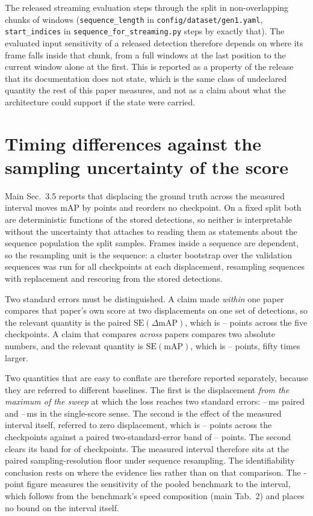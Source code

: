 \documentclass[10pt,twocolumn,letterpaper]{article}
\begin{document}
The released streaming evaluation steps through the split in non-overlapping chunks of
\ssmEvalChunk{} windows (\texttt{sequence\_length} in \texttt{config/dataset/gen1.yaml},
\texttt{start\_indices} in \texttt{sequence\_for\_streaming.py} steps by exactly that). The
evaluated input sensitivity of a released detection therefore depends on where its frame falls inside
that chunk, from a full \ssmEvalChunk{} windows at the last position to the current window
alone at the first. This is reported as a property of the release that its documentation does
not state, which is the same class of undeclared quantity the rest of this paper measures,
and not as a claim about what the architecture could support if the state were carried.


\section{Timing differences against the sampling uncertainty of the score}

Main Sec.~3.5 reports that displacing the ground truth across the measured interval moves
mAP by \mapCost{} points and reorders no checkpoint. On a fixed split both are
deterministic functions of the stored detections, so neither is interpretable without the
uncertainty that attaches to reading them as statements about the sequence population the
split samples. Frames inside a sequence are
dependent, so the resampling unit is the sequence: a cluster bootstrap over the
\outSeqsScanned{} validation sequences was run for all \rankCkpts{} checkpoints at each
displacement, resampling sequences with replacement and rescoring from the stored
detections.

Two standard errors must be distinguished. A claim made \emph{within} one paper compares
that paper's own score at two displacements on one set of detections, so the relevant
quantity is the paired $\mathrm{SE}(\Delta\mathrm{mAP})$, which is \seDmapLo--\seDmapHi{}
points across the five checkpoints. A claim that compares \emph{across} papers compares two
absolute numbers, and the relevant quantity is $\mathrm{SE}(\mathrm{mAP})$, which is
\seMapLo--\seMapHi{} points, fifty times larger.

Two quantities that are easy to conflate are therefore reported separately, because they
are referred to different baselines. The first is the displacement \emph{from the maximum
of the sweep} at which the loss reaches two standard errors: \resPairedLo--\resPairedHi\,ms
paired and \resAbsLo--\resAbsHi\,ms in the single-score sense. The second is the effect of
the measured interval itself, referred to zero displacement, which is
\effTauLo--\effTauHi{} points across the \rankCkpts{} checkpoints against a paired
two-standard-error band of \twoSeDmapLo--\twoSeDmapHi{} points. The second clears its band
for \effTauResolved{} of \rankCkpts{} checkpoints. The measured interval therefore sits at
the paired sampling-resolution floor under sequence resampling. The identifiability conclusion
rests on where the evidence lies rather than on that comparison. The
\mapCost{}-point figure measures the sensitivity of the pooled benchmark to the interval,
which follows from the benchmark's speed composition (main Tab.~2) and places no bound on
the interval itself.
\end{document}
